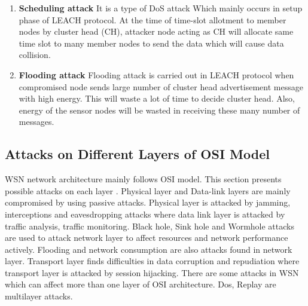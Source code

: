 \begin{enumerate}[label=\textbf{\roman*.}]
    \item \textbf{Scheduling attack }\cite{almomani2015performance} It is a type of DoS attack Which mainly occurs in setup phase of LEACH protocol. At the time of time-slot allotment to member nodes by cluster head (CH), attacker node acting as CH will allocate same time slot to many member nodes to send the data which will cause data collision.
    
    \item \textbf{Flooding attack }\cite{almomani2015performance} Flooding attack is carried out in LEACH protocol when compromised node sends large number of cluster head advertisement message with high energy. This will waste a lot of time to decide cluster head. Also, energy of the sensor nodes will be wasted in receiving these many number of messages.
\end{enumerate}

\subsection{Attacks on Different Layers of OSI Model}
WSN network architecture mainly follows OSI model. This section presents possible attacks on each layer \cite{lupu2009main}. Physical layer and Data-link layers are mainly compromised by using passive attacks. Physical layer is attacked by jamming, interceptions and eavesdropping attacks where data link layer is attacked by traffic analysis, traffic monitoring. Black hole, Sink hole and Wormhole attacks are used to attack network layer to affect resources and network performance actively. Flooding and network consumption are also attacks found in network layer. Transport layer finds difficulties in data corruption and repudiation where transport layer is attacked by session hijacking. There are some attacks in WSN which can affect more than one layer of OSI architecture. Dos, Replay are multilayer attacks.

